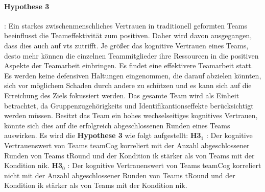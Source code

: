 \documentclass[a4paper,11pt]{article}%
\renewcommand{\\}{\vspace*{0.5\baselineskip} \newline}
\begin{document}
\paragraph{Hypothese 3}:
%
Ein starkes zwischenmenschliches Vertrauen in traditionell geformten Teams beeinflusst die Teameffektivität zum positiven. Daher wird davon ausgegangen, dass dies auch auf \ac{vts} zutrifft. 
Je größer das kognitive Vertrauen eines Teams, desto mehr können die einzelnen Teammitglieder ihre Ressourcen in die positiven Aspekte der Teamarbeit einbringen. Es findet eine effektivere Teamarbeit statt. Es werden keine defensiven Haltungen eingenommen, die darauf abzielen könnten, sich vor möglichem Schaden durch andere zu schützen und es kann sich auf die Erreichung des Ziels fokussiert werden. 
Das gesamte Team wird als Einheit betrachtet, da Gruppenzugehörigkeits und Identifikantionseffekte berücksichtigt werden müssen. Besitzt das Team ein hohes wechselseitiges kognitives Vertrauen, könnte sich dies auf die erfolgreich abgeschlossenen Runden eines Teams auswirken. 
Es wird die \textbf{Hypothese 3} wie folgt aufgestellt:\\
\textbf{H3$_{1}$} : Der kognitive Vertrauenswert von Teams \ac{teamCog} korreliert mit der Anzahl abgeschlossener Runden von Teams \ac{tRound} und der Kondition \ac{ik} stärker als von Teams mit der Kondition \ac{nik}. \newline
\textbf{H3$_{0}$} : Der kognitive Vertrauenswert von Teams \ac{teamCog} korreliert nicht mit der Anzahl abgeschlossener Runden von Teams \ac{tRound} und der Kondition \ac{ik} stärker als von Teams mit der Kondition \ac{nik}. \\
%
\end{document}
